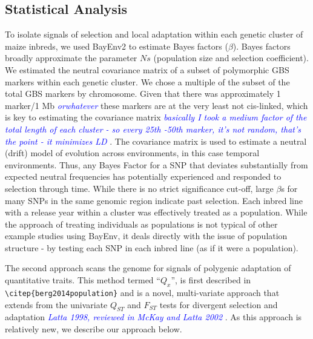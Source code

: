 \documentclass[9pt,twocolumn,twoside]{gsajnl}
\newcommand{\kc}[1]{\textcolor{blue}{ \emph{ #1}} }
\begin{document}
\subsection*{Statistical Analysis} 
To isolate signals of selection and local adaptation within each genetic cluster of maize inbreds, we used BayEnv2 \citep{Coop:2010ke} to estimate Bayes factors ($\beta$). Bayes factors broadly approximate the parameter $Ns$ (population size and selection coefficient).
We estimated the neutral covariance matrix of a subset of polymorphic GBS markers within each genetic cluster. We chose a multiple of the subset of the total GBS markers by chromosome. 
Given that there was approximately 1 marker/1 Mb \kc{orwhatever} these markers are at the very least not cis-linked, which is key to estimating the covariance matrix \kc{basically I took a medium factor of the total length of each cluster - so every 25th -50th marker, it's not random, that's the point - it minimizes LD}. 
The covariance matrix is used to estimate a neutral (drift) model of evolution across environments, in this case temporal environments. 
Thus, any Bayes Factor for a SNP that deviates substantially from expected neutral frequencies has potentially experienced and responded to selection through time.  While there is no strict significance cut-off, large $\beta$s for many SNPs in the same genomic region indicate past selection.
Each inbred line with a release year within a cluster was effectively treated as a population. 
While the approach of treating individuals as populations is not typical of other example studies using BayEnv, it deals directly with the issue of population structure - by testing each SNP in each inbred line (as if it were a population). 

The second approach scans the genome for signals of polygenic adaptation of quantitative traits. This method termed ``$Q_x$'', is first described in \verb|\citep{berg2014population}| and is a novel, multi-variate approach that extends from the univariate $Q_{ST}$ and $F_{ST}$ tests for divergent selection and adaptation \kc{Latta 1998, reviewed in McKay and Latta 2002}. 
As this approach is relatively new, we describe our approach below.
\end{document}

